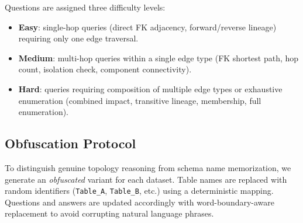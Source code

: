 Questions are assigned three difficulty levels:
\begin{itemize}
  \item \textbf{Easy}: single-hop queries (direct FK adjacency, forward/reverse
    lineage) requiring only one edge traversal.
  \item \textbf{Medium}: multi-hop queries within a single edge type
    (FK shortest path, hop count, isolation check, component connectivity).
  \item \textbf{Hard}: queries requiring composition of multiple edge types
    or exhaustive enumeration (combined impact, transitive lineage,
    membership, full enumeration).
\end{itemize}

\subsection{Obfuscation Protocol}

To distinguish genuine topology reasoning from schema name memorization,
we generate an \emph{obfuscated} variant for each dataset.  Table names
are replaced with random identifiers (\texttt{Table\_A},
\texttt{Table\_B}, etc.) using a deterministic mapping.  Questions and
answers are updated accordingly with word-boundary-aware replacement to
avoid corrupting natural language phrases.
